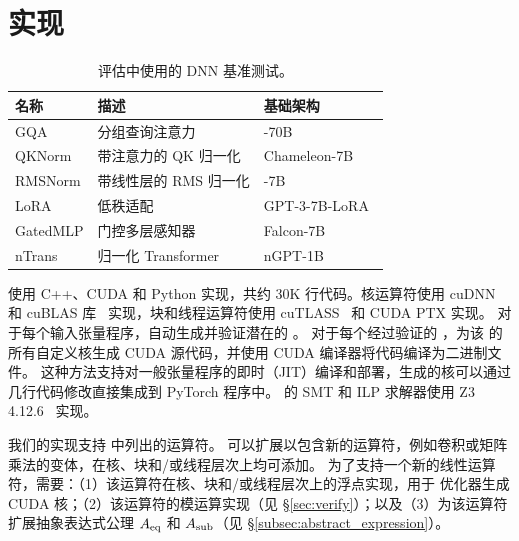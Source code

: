 \section{实现}
\label{sec:impl}

\begin{table}
    \centering
    \caption{评估中使用的 DNN 基准测试。}
    \vspace{\captionvspace}
    \footnotesize
    \label{tab:benchmarks}
    \begin{tabular}{l|l|l}
    \toprule
    {\bf 名称} & {\bf 描述} & {\bf 基础架构} \\
    \midrule
    GQA & 分组查询注意力 & \llama-3-70B~\cite{grattafiori2024llama3herdmodels}\\
    QKNorm & 带注意力的 QK 归一化 & Chameleon-7B~\cite{chameleonteam2024chameleon} \\
    RMSNorm & 带线性层的 RMS 归一化 & \llama-2-7B~\cite{llama2}\\
    LoRA & 低秩适配 & GPT-3-7B-LoRA~\cite{llama-7b-lora} \\
    GatedMLP & 门控多层感知器 & Falcon-7B~\cite{falcon40b}\\
    nTrans & 归一化 Transformer & nGPT-1B~\cite{loshchilov2024ngpt}\\
    \bottomrule
    \end{tabular}
    \vspace{\captionvspace}
    \vspace{\captionvspace}
\end{table}

\sys 使用 C++、CUDA 和 Python 实现，共约 30K 行代码。核运算符使用 cuDNN 和 cuBLAS 库~\cite{cudnn, cublas} 实现，块和线程运算符使用 cuTLASS~\cite{cutlass} 和 CUDA PTX 实现。
对于每个输入张量程序，\sys 自动生成并验证潜在的 \graphs。
对于每个经过验证的 \graph，\sys 为该 \graph 的所有自定义核生成 CUDA 源代码，并使用 CUDA 编译器将代码编译为二进制文件。
这种方法支持对一般张量程序的即时（JIT）编译和部署，生成的核可以通过几行代码修改直接集成到 PyTorch 程序中。
\sys 的 SMT 和 ILP 求解器使用 Z3 4.12.6~\cite{z3} 实现。

我们的实现支持  中列出的运算符。
\sys 可以扩展以包含新的运算符，例如卷积或矩阵乘法的变体，在核、块和/或线程层次上均可添加。
为了支持一个新的线性运算符，\sys 需要：（1）该运算符在核、块和/或线程层次上的浮点实现，用于 \graph 优化器生成 CUDA 核；（2）该运算符的模运算实现（见 \S\ref{sec:verify}）；以及（3）为该运算符扩展抽象表达式公理 $A_\text{eq}$ 和 $A_\text{sub}$（见 \S\ref{subsec:abstract_expression}）。

